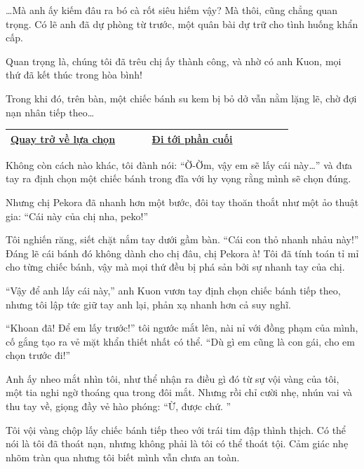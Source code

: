 \documentclass[../main.tex]{subfiles}
\begin{document}
\dots Mà anh ấy kiếm đâu ra bó cà rốt siêu hiếm vậy? Mà thôi, cũng chẳng quan trọng. Có lẽ anh đã dự phòng từ trước, một quân bài dự trữ cho tình huống khẩn cấp.

Quan trọng là, chúng tôi đã trêu chị ấy thành công, và nhờ có anh Kuon, mọi thứ đã kết thúc trong hòa bình!

Trong khi đó, trên bàn, một chiếc bánh su kem bị bỏ dở vẫn nằm lặng lẽ, chờ đợi nạn nhân tiếp theo\dots

\begin{table}[H]
  \centering
  \setlength{\arrayrulewidth}{1pt}
  \begin{tabular}{|>{\centering\arraybackslash}p{0.4\linewidth}|>{\centering\arraybackslash}p{0.4\linewidth}|}
    \hline
    \hyperref[choice]{Quay trở về lựa chọn} & \hyperref[ending]{Đi tới phần cuối} \\ \hline
  \end{tabular}
\end{table}

\newpage
\label{cakeC}

Không còn cách nào khác, tôi đành nói: ``Ờ-Ờm, vậy em sẽ lấy cái này\dots'' và đưa tay ra định chọn một chiếc bánh trong đĩa với hy vọng rằng mình sẽ chọn đúng.

Nhưng chị Pekora đã nhanh hơn một bước, đôi tay thoăn thoắt như một ảo thuật gia: ``Cái này của chị nha, peko!''

Tôi nghiến răng, siết chặt nắm tay dưới gầm bàn. ``Cái con thỏ nhanh nhảu này!'' Đáng lẽ cái bánh đó không dành cho chị đâu, chị Pekora à! Tôi đã tính toán tỉ mỉ cho từng chiếc bánh, vậy mà mọi thứ đều bị phá sản bởi sự nhanh tay của chị.

``Vậy để anh lấy cái này,'' anh Kuon vươn tay định chọn chiếc bánh tiếp theo, nhưng tôi lập tức giữ tay anh lại, phản xạ nhanh hơn cả suy nghĩ.

``Khoan đã! Để em lấy trước!'' tôi ngước mắt lên, nài nỉ với đồng phạm của mình, cố gắng tạo ra vẻ mặt khẩn thiết nhất có thể. ``Dù gì em cũng là con gái, cho em chọn trước đi!''

Anh ấy nheo mắt nhìn tôi, như thể nhận ra điều gì đó từ sự vội vàng của tôi, một tia nghi ngờ thoáng qua trong đôi mắt. Nhưng rồi chỉ cười nhẹ, nhún vai và thu tay về, giọng đầy vẻ hào phóng: ``Ừ, được chứ. ''

Tôi vội vàng chộp lấy chiếc bánh tiếp theo với trái tim đập thình thịch. Có thể nói là tôi đã thoát nạn, nhưng không phải là tôi có thể thoát tội. Cảm giác nhẹ nhõm tràn qua nhưng tôi biết mình vẫn chưa an toàn.
\end{document}
